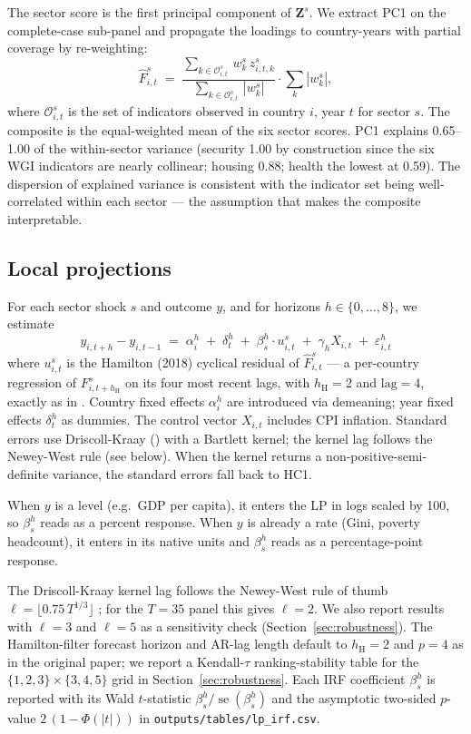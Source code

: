 The sector score is the first principal component of $\bm{Z}^s$. We extract PC1 on the complete-case sub-panel and propagate the loadings to country-years with partial coverage by re-weighting:
\[
  \hat{F}^s_{i,t} \;=\; \frac{\sum_{k \in \mathcal{O}^s_{i,t}} \, w^s_k \, z^s_{i,t,k}}{\sum_{k \in \mathcal{O}^s_{i,t}}\, |w^s_k|} \cdot \sum_{k} |w^s_k|,
\]
where $\mathcal{O}^s_{i,t}$ is the set of indicators observed in country $i$, year $t$ for sector $s$. The composite is the equal-weighted mean of the six sector scores. PC1 explains 0.65--1.00 of the within-sector variance (security 1.00 by construction since the six WGI indicators are nearly collinear; housing 0.88; health the lowest at 0.59). The dispersion of explained variance is consistent with the indicator set being well-correlated within each sector --- the assumption that makes the composite interpretable.

\subsection{Local projections}\label{sec:lp_method}

For each sector shock $s$ and outcome $y$, and for horizons $h \in \{0,\dots,8\}$, we estimate
\[
  y_{i, t+h} - y_{i, t-1} \;=\; \alpha_i^h \;+\; \delta_t^h \;+\; \beta_s^h \cdot u^s_{i, t} \;+\; \gamma_h X_{i,t} \;+\; \varepsilon_{i,t}^h
\]
where $u^s_{i,t}$ is the Hamilton (2018) cyclical residual of $\hat{F}^s_{i,t}$ --- a per-country regression of $F^s_{i,t+h_{\text{H}}}$ on its four most recent lags, with $h_{\text{H}} = 2$ and $\text{lag} = 4$, exactly as in \textcite{hamilton2018filter}. Country fixed effects $\alpha_i^h$ are introduced via demeaning; year fixed effects $\delta_t^h$ as dummies. The control vector $X_{i,t}$ includes CPI inflation. Standard errors use Driscoll-Kraay (\citeyear{driscollkraay1998}) with a Bartlett kernel; the kernel lag follows the Newey-West rule (see below). When the kernel returns a non-positive-semi-definite variance, the standard errors fall back to HC1.

When $y$ is a level (e.g.\ GDP per capita), it enters the LP in logs scaled by 100, so $\beta^h_s$ reads as a percent response. When $y$ is already a rate (Gini, poverty headcount), it enters in its native units and $\beta^h_s$ reads as a percentage-point response.

The Driscoll-Kraay kernel lag follows the Newey-West rule of thumb $\ell = \lfloor 0.75 \, T^{1/3} \rfloor$ \parencite{newey1987simple}; for the $T = 35$ panel this gives $\ell = 2$. We also report results with $\ell = 3$ and $\ell = 5$ as a sensitivity check (Section~\ref{sec:robustness}). The Hamilton-filter forecast horizon and AR-lag length default to $h_{\text{H}} = 2$ and $p = 4$ as in the original paper; we report a Kendall-$\tau$ ranking-stability table for the $\{1, 2, 3\} \times \{3, 4, 5\}$ grid in Section~\ref{sec:robustness}. Each IRF coefficient $\beta^h_s$ is reported with its Wald $t$-statistic $\beta^h_s / \operatorname{se}(\beta^h_s)$ and the asymptotic two-sided $p$-value $2 \, (1 - \Phi(|t|))$ in \texttt{outputs/tables/lp\_irf.csv}.

